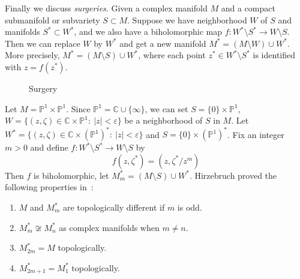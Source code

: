Finally we discuss \emph{surgeries}.
Given a complex manifold $M$ and a compact submanifold or subvariety $S\subset M$.
Suppose we have neighborhood $W$ of $S$ and manifolds $S^*\subset W^*$, and we also have a biholomorphic map $f:W^*\setminus S^*\to W\setminus S$.
Then we can replace $W$ by $W^*$ and get a new manifold $M^*=(M\setminus W)\cup W^*$.
More precisely, $M^*=(M\setminus S)\cup W^*$, where each point $z^*\in W^*\setminus S^*$ is identified with $z=f(z^*)$.

\begin{figure}[H]
    \centering
    
    \caption{Surgery}
\end{figure}

\begin{eg}[Hirzebruch]
    Let $M=\mathbb{P}^1\times\mathbb{P}^1$.
    Since $\mathbb{P}^1=\mathbb{C}\cup\{\infty\}$, we can set $S=\{0\}\times\mathbb{P}^1$, $W=\{(z,\zeta)\in\mathbb{C}\times\mathbb{P}^1:\ |z|<\varepsilon\}$ be a neighborhood of $S$ in $M$.
    Let $W^*=\{(z,\zeta)\in\mathbb{C}\times(\mathbb{P}^1)^*:\ |z|<\varepsilon\}$ and $S=\{0\}\times(\mathbb{P}^1)^*$.
    Fix an integer $m>0$ and define $f:W^*\setminus S^*\to W\setminus S$ by
    \[f(z,\zeta^*)=(z,\zeta^*/z^m)\]
    Then $f$ is biholomorphic, let $M_m^*=(M\setminus S)\cup W^*$.
    Hirzebruch proved the following properties in~\cite{Hirzebruch51}:
    \begin{enumerate}
        \item $M$ and $M_m^*$ are topologically different if $m$ is odd.
        \item $M_m^*\not\cong M_n^*$ as complex manifolds when $m\neq n$.
        \item $M^*_{2m}=M$ topologically.
        \item $M^*_{2m+1}=M^*_1$ topologically.
    \end{enumerate}
\end{eg}


